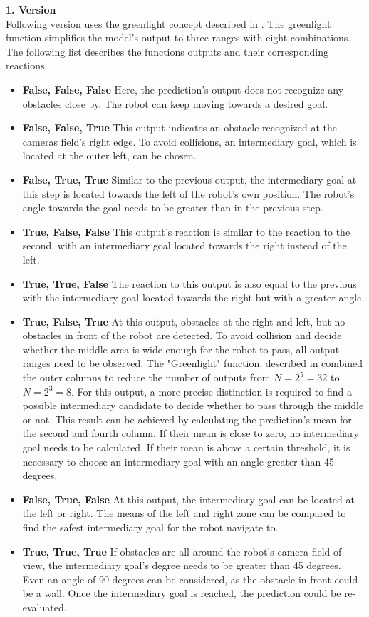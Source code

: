 \textbf{1. Version}\\
Following version uses the greenlight concept described in . The greenlight function simplifies the model's output to three ranges with eight combinations. The following list describes the functions outputs and their corresponding reactions.
\begin{itemize}
\item  \textbf{False, False, False} Here, the prediction's output does not recognize any obstacles close by. The robot can keep moving towards a desired goal.
\item  \textbf{False, False, True} This output indicates an obstacle recognized at the cameras field's right edge. To avoid collisions, an intermediary goal, which is located at the outer left, can be chosen. 
\item  \textbf{False, True, True} Similar to the previous output, the intermediary goal at this step is located towards the left of the robot's own position. The robot's angle towards the goal needs to be greater than in the previous step.
\item  \textbf{True, False, False} This output's reaction is similar to the reaction to the second, with an intermediary goal located towards the right instead of the left.
\item  \textbf{True, True, False} The reaction to this output is also equal to the previous with the intermediary goal located towards the right but with a greater angle.
\item  \textbf{True, False, True} At this output, obstacles at the right and left, but no obstacles in front of the robot are detected. To avoid collision and decide whether the middle area is wide enough for the robot to pass, all output ranges need to be observed. The "Greenlight" function, described in  combined the outer columns to reduce the number of outputs from $N = 2^5 = 32$ to $N = 2^3 = 8$. For this output, a more precise distinction is required to find a possible intermediary candidate to decide whether to pass through the middle or not. This result can be achieved by calculating the prediction's mean for the second and fourth column. If their mean is close to zero, no intermediary goal needs to be calculated. If their mean is above a certain threshold, it is necessary to choose an intermediary goal with an angle greater than 45 degrees.
\item  \textbf{False, True, False} At this output, the intermediary goal can be located at the left or right. The means of the left and right zone can be compared to find the safest intermediary goal for the robot navigate to.
\item  \textbf{True, True, True} If obstacles are all around the robot's camera field of view, the intermediary goal's degree needs to be greater than 45 degrees. Even an angle of 90 degrees can be considered, as the obstacle in front could be a wall. Once the intermediary goal is reached, the prediction could be re-evaluated.
\end{itemize}

